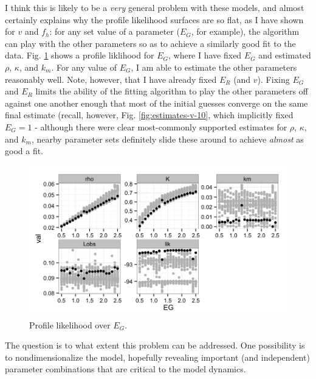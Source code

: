 \documentclass[12pt,reqno,final,pdftex]{amsart}\usepackage[]{graphicx}\usepackage[]{color}
\newenvironment{knitrout}{}{} %
\theoremstyle{plain}
\numberwithin{equation}{part}
\begin{document}
I think this is likely to be a \emph{very} general problem with these models, and almost certainly explains why the profile likelihood surfaces are so flat, as I have shown for $v$ and $f_h$: for any set value of a parameter ($E_G$, for example), the algorithm can play with the other parameters so as to achieve a similarly good fit to the data.
Fig. \ref{fig:profile-EG} shows a profile liklihood for $E_G$, where I have fixed $E_G$ and estimated $\rho$, $\kappa$, and $k_m$.
For any value of $E_G$, I am able to estimate the other parameters reasonably well.
Note, however, that I have already fixed $E_R$ (and $v$).
Fixing $E_G$ and $E_R$ limits the ability of the fitting algorithm to play the other parameters off against one another enough that most of the initial guesses converge on the same final estimate (recall, however, Fig. \ref{fig:estimates-v-10}, which implicitly fixed $E_G=1$ - although there were clear most-commonly supported estimates for $\rho$, $\kappa$, and $k_m$, nearby parameter sets definitely slide these around to achieve \emph{almost} as good a fit.
\begin{knitrout}\scriptsize
{}\color{fgcolor}\begin{figure}

\includegraphics[width=\linewidth]{figure/profile-EG-1} \hfill{}

\caption[Profile likelihood over ]{Profile likelihood over $E_G$.}\label{fig:profile-EG}
\end{figure}


\end{knitrout}

The question is to what extent this problem can be addressed.
One possibility is to nondimensionalize the model, hopefully revealing important (and independent) parameter combinations that are critical to the model dynamics.
\end{document}
